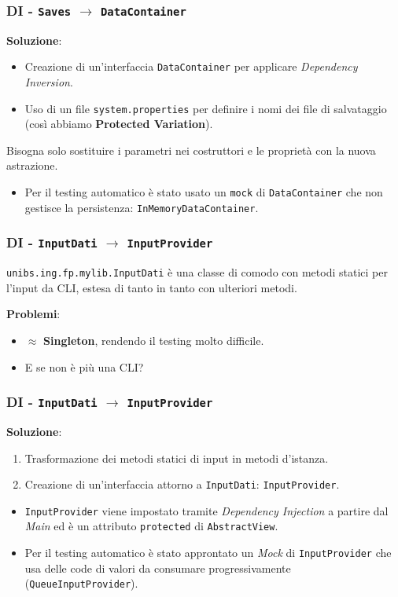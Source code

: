 \begin{frame}
    \frametitle{DI - \texttt{Saves} $\to$ \texttt{DataContainer}}
    \textbf{Soluzione}:
    \begin{itemize}
        \item Creazione di un'interfaccia \texttt{DataContainer} per applicare \emph{Dependency Inversion}.
        \item Uso di un file \texttt{system.properties} per definire i nomi dei file di salvataggio
        (così abbiamo \textbf{Protected Variation}).
    \end{itemize}
    Bisogna solo sostituire i parametri nei costruttori e le proprietà con la nuova astrazione.
    \begin{itemize}
        \item Per il testing automatico è stato usato un \texttt{mock} di \texttt{DataContainer} che non gestisce
        la persistenza: \texttt{InMemoryDataContainer}.
    \end{itemize}
\end{frame}

\begin{frame}
    \frametitle{DI - \texttt{InputDati} $\to$ \texttt{InputProvider}}
    \texttt{unibs.ing.fp.mylib.InputDati} è una classe di comodo con metodi statici per l'input
    da CLI, estesa di tanto in tanto con ulteriori metodi.

    \textbf{Problemi}:
    \begin{itemize}
        \item {\color{red}$\approx$ \textbf{Singleton}}, rendendo il testing molto difficile.
        \item E se non è più una CLI?
    \end{itemize}
\end{frame}

\begin{frame}
    \frametitle{DI - \texttt{InputDati} $\to$ \texttt{InputProvider}}
    \textbf{Soluzione}:
    \begin{enumerate}
        \item Trasformazione dei metodi statici di input in metodi d'istanza.
        \item Creazione di un'interfaccia attorno a \texttt{InputDati}: \texttt{InputProvider}.
    \end{enumerate}
    \begin{itemize}
        \item \texttt{InputProvider} viene impostato tramite \emph{Dependency Injection} a partire dal \emph{Main}
        ed è un attributo \texttt{protected} di \texttt{AbstractView}.
        \item Per il testing automatico è stato approntato un \emph{Mock} di \texttt{InputProvider} che usa delle code
        di valori da consumare progressivamente (\texttt{QueueInputProvider}).
    \end{itemize}
\end{frame}

